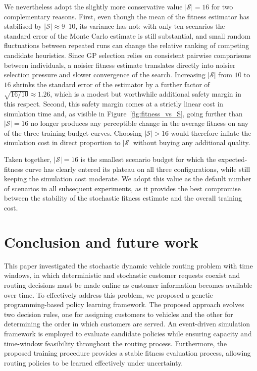 \documentclass[pdflatex]{sn-jnl}
\begin{document}
We nevertheless adopt the slightly more conservative value $|\mathcal{S}|=16$ for two complementary reasons. First, even though the mean of the fitness estimator has stabilised by $|\mathcal{S}|\approx 9$--$10$, its variance has not: with only ten scenarios the standard error of the Monte Carlo estimate is still substantial, and small random fluctuations between repeated runs can change the relative ranking of competing candidate heuristics. Since GP selection relies on consistent pairwise comparisons between individuals, a noisier fitness estimate translates directly into noisier selection pressure and slower convergence of the search. Increasing $|\mathcal{S}|$ from $10$ to $16$ shrinks the standard error of the estimator by a further factor of $\sqrt{16/10}\approx 1.26$, which is a modest but worthwhile additional safety margin in this respect. Second, this safety margin comes at a strictly linear cost in simulation time and, as visible in Figure~\ref{fig:fitness_vs_S}, going further than $|\mathcal{S}|=16$ no longer produces any perceptible change in the average fitness on any of the three training-budget curves. Choosing $|\mathcal{S}|>16$ would therefore inflate the simulation cost in direct proportion to $|\mathcal{S}|$ without buying any additional quality.

Taken together, $|\mathcal{S}|=16$ is the smallest scenario budget for which the expected-fitness curve has clearly entered its plateau on all three configurations, while still keeping the simulation cost moderate. We adopt this value as the default number of scenarios in all subsequent experiments, as it provides the best compromise between the stability of the stochastic fitness estimate and the overall training cost.

\section{Conclusion and future work} \label{sec:con}

This paper investigated the stochastic dynamic vehicle routing problem with time windows, in which deterministic and stochastic customer requests coexist and routing decisions must be made online as customer information becomes available over time. To effectively address this problem, we proposed a genetic programming-based policy learning framework. The proposed approach evolves two decision rules, one for assigning customers to vehicles and the other for determining the order in which customers are served. An event-driven simulation framework is employed to evaluate candidate policies while ensuring capacity and time-window feasibility throughout the routing process. Furthermore, the proposed training procedure provides a stable fitness evaluation process, allowing routing policies to be learned effectively under uncertainty.
\end{document}
